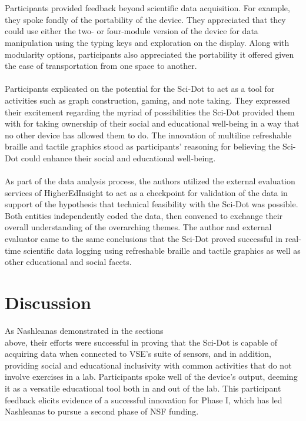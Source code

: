 \documentclass[11.5pt]{sig-alternate}
\begin{document}
\begin{large}
\\\\Participants provided feedback beyond scientific data acquisition. For example, they spoke fondly of the portability of the device. They appreciated that they could use either the two- or four-module version of the device for data manipulation using the typing keys and exploration on the display. Along with modularity options, participants also appreciated the portability it offered given the ease of transportation from one space to another. 
\\\\Participants explicated on the potential for the Sci-Dot to act as a tool for activities such as graph construction, gaming, and note taking. They expressed their excitement regarding the myriad of possibilities the Sci-Dot provided them with for taking ownership of their social and educational well-being in a way that no other device has allowed them to do. The innovation of multiline refreshable braille and tactile graphics stood as participants’ reasoning for believing the Sci-Dot could enhance their social and educational well-being. 
\\\\As part of the data analysis process, the authors utilized the external evaluation services of HigherEdInsight to act as a checkpoint for validation of the data in support of the hypothesis that technical feasibility with the Sci-Dot was possible. Both entities independently coded the data, then convened to exchange their overall understanding of the overarching themes. The author and external evaluator came to the same conclusions that the Sci-Dot proved successful in real-time scientific data logging using refreshable braille and tactile graphics as well as other educational and social facets.
\section*{Discussion}

As Nashleanas demonstrated in the sections \\above, their efforts were successful in proving that the Sci-Dot is capable of acquiring data when connected to VSE’s suite of sensors, and in addition, providing social and educational inclusivity with common activities that do not involve exercises in a lab. Participants spoke well of the device’s output, deeming it as a versatile educational tool both in and out of the lab. This participant feedback elicits evidence of a successful innovation for Phase I, which has led Nashleanas to pursue a second phase of NSF funding.


\end{large}
\end{document}
